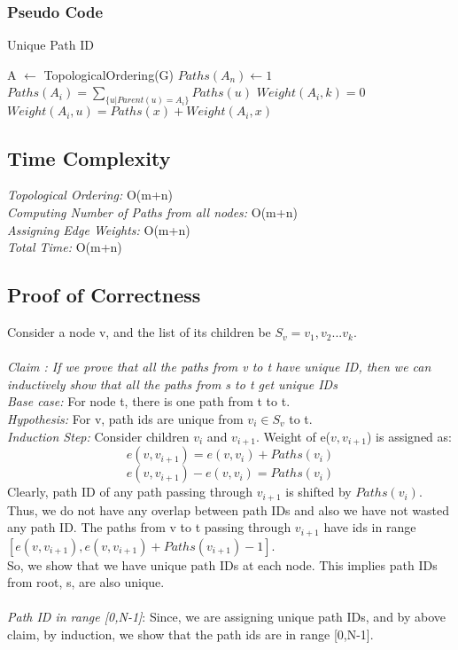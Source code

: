 \documentclass{article}
\begin{document}
\subsubsection{Pseudo Code}
\begin{algorithm}
\caption{Unique Path ID}
\label{hm}
\begin{algorithmic}[1]
\State A $\gets$ TopologicalOrdering(G) 
\State $Paths(A_n) \gets 1$ 
\State $Paths(A_i) = \sum_{\{u | Parent(u)=A_i\}}Paths(u)$ 
\EndFor {}
\State $Weight(A_i,k) = 0$ 
\State $Weight(A_i,u) = Paths(x) + Weight(A_i,x) $
\EndFor
\EndFor {}
\EndProcedure
\end{algorithmic}
\end{algorithm}

\subsection{Time Complexity}
\emph{Topological Ordering: } O(m+n)\\
\emph{Computing Number of Paths from all nodes: } O(m+n)\\
\emph{Assigning Edge Weights:} O(m+n)\\
\emph{Total Time: }O(m+n)
\subsection{Proof of Correctness}
Consider a node v, and the list of its children be $S_v = {v_1,v_2 ... v_k}$.  \\ \\
\emph{Claim : If we prove that all the paths from v to t have unique ID, then we can inductively show that all the paths from s to t get unique IDs} \\
\emph{Base case: } For node t, there is one path from t to t. \\
\emph{Hypothesis: } For v, path ids are unique from $v_i \in S_v$ to t.\\
\emph{Induction Step: }Consider children $v_i$ and $v_{i+1}$. Weight of e($v,v_{i+1}$) is assigned as:
$$e(v,v_{i+1}) = e(v,v_i)+ Paths(v_i)$$
$$e(v,v_{i+1}) - e(v,v_i) = Paths(v_i)$$
Clearly, path ID of any path passing through $v_{i+1}$ is shifted by $Paths(v_i)$. Thus, we do not have any overlap between path IDs and also we have not wasted any path ID. The paths from v to t passing through $v_{i+1}$ have ids in range $[e(v,v_{i+1}),e(v,v_{i+1})+ Paths(v_{i+1})-1]$.\\
So, we show that we have unique path IDs at each node. This implies path IDs from root, s, are also unique.\\ \\
\emph{Path ID in range [0,N-1]}: Since, we are assigning unique path IDs, and by above claim, by induction, we show that the path ids are in range [0,N-1].
\end{document}
